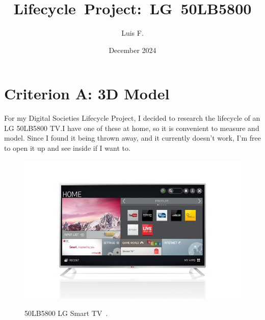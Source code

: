 \documentclass[12pt, letterpaper]{article}
\begin{document}
\title{\vspace{-3em}\Large{\textbf{\mbox{\hspace{-0.25em}Lifecycle
Project: LG 50LB5800}}}} %
\author{\small{Luis F.}}
\date{\vspace{-0.5em}\small{December 2024}}

\maketitle


\vspace{-2em}

\tableofcontents

\section{Criterion A: 3D Model}

For my Digital Societies Lifecycle Project, I decided to research the
lifecycle of an LG 50LB5800 TV.\@ I have one of these at home, so it is
convenient to measure and model. Since I found it being thrown away,
and it currently doesn't work, I'm free to open it up and see inside
if I want to.

\begin{figure}[H]
  \medskip
  \centering
  \includegraphics[width=1\linewidth]{lg-50LB5800}
  \caption{50LB5800 LG Smart TV~\autocite{unknown-author-no-dateB}.}
  \medskip\label{fig:lg-50LB5800}
\end{figure}
\end{document}
